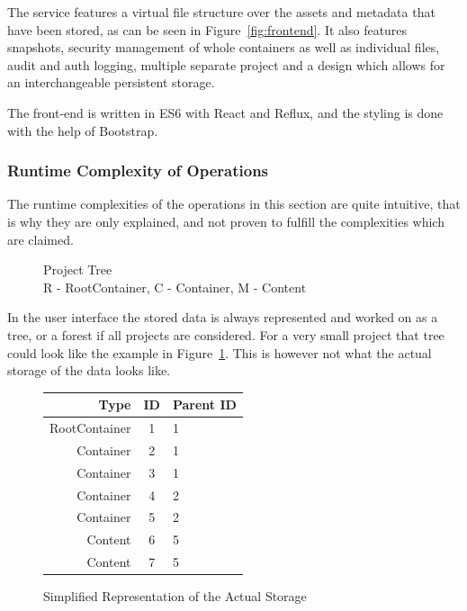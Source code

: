\documentclass[a4paper,12pt]{article}
\begin{document}
The service features a virtual file structure over the assets and metadata that have been stored,
as can be seen in Figure~\ref{fig:frontend}. It also features snapshots, security management of
whole containers as well as individual files, audit and auth logging, multiple separate project 
and a design which allows for an interchangeable persistent storage.

The front-end is written in ES6 with React and Reflux, and the styling is done with the help of
Bootstrap.

\subsubsection{Runtime Complexity of Operations} \label{sec:run_time}
The runtime complexities of the operations in this section are quite intuitive, that is why they 
are only explained, and not proven to fulfill the complexities which are claimed. 

\begin{figure}[H] 
    \caption{Project Tree\\R - RootContainer, C - Container, M - Content}
    \label{fig:project_tree}
\end{figure}

In the user interface the stored data is always represented and worked on as a tree, or a forest if
all projects are considered. For a very small project that tree could look like the example in
Figure~\ref{fig:project_tree}. This is however not what the actual storage of the data looks like.

\begin{figure}[H] 
    \centering
    \renewcommand{\arraystretch}{1.3}
    \begin{tabular}{|r|c|l|}
        \hline
        \textbf{Type} & \textbf{ID} & \textbf{Parent ID} \\
        \hline
        RootContainer & 1 & 1 \\
        Container     & 2 & 1 \\
        Container     & 3 & 1 \\
        Container     & 4 & 2 \\
        Container     & 5 & 2 \\
        Content       & 6 & 5 \\
        Content       & 7 & 5 \\
        \hline
    \end{tabular}
    \renewcommand{\arraystretch}{1.0}
    \caption{Simplified Representation of the Actual Storage}
    \label{fig:storage}
\end{figure}
\end{document}
